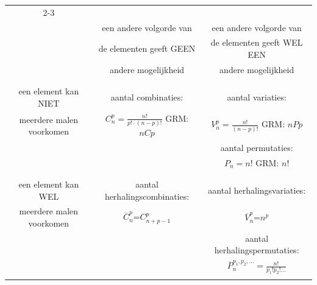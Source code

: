 
\begin{center}
\begin{tabular}{|c|c|c|}
\cline{2-3}
\multicolumn{1}{c|}{} & &\\
\multicolumn{1}{c|}{} & een andere volgorde van & een andere volgorde van\\
\multicolumn{1}{c|}{} & de elementen geeft GEEN & de elementen geeft WEL EEN\\
\multicolumn{1}{c|}{} & andere mogelijkheid & andere mogelijkheid\\
\multicolumn{1}{c|}{} & &\\
\hline
&&\\
een element kan NIET & aantal combinaties: & aantal variaties: \\
meerdere malen voorkomen & $C_n^p=\frac{n!}{p!\cdot(n-p)!}$ \qquad GRM: $nCp$ & $V_n^p=\frac{n!}{(n-p)!}$  \qquad  GRM: $nPp$\\
 & &  aantal permutaties:\\
 & & $P_n=n$! \qquad GRM: $n!$\\
&&\\
\hline
&&\\
een element kan WEL & aantal herhalingscombinaties: & aantal herhalingsvariaties: \\
meerdere malen voorkomen & $\overline{C}_n^p$=$C_{n+p-1}^p$ & $\overline{V}_n^p$=$n^p$ \\
 & & aantal herhalingspermutaties:   \\
 & & $\overline{P}_n^{p_1,p_2, \dots} =\frac{n!}{p_1!p_2!\dots}$\\
&&\\
\hline
\end{tabular}
\end{center}


